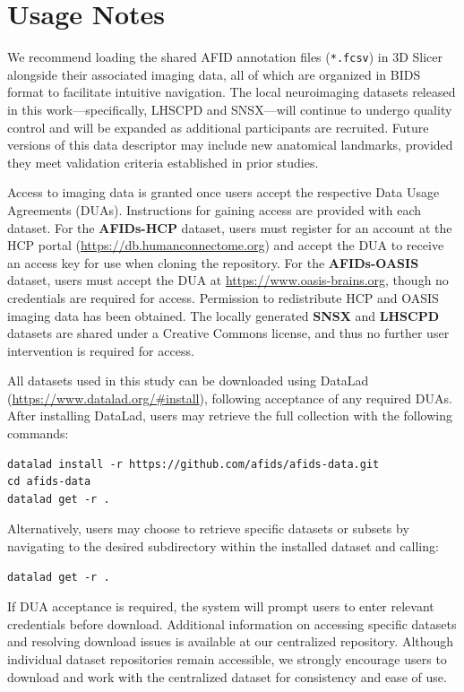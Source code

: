 \section{Usage Notes}
We recommend loading the shared AFID annotation files (\texttt{*.fcsv}) in 3D Slicer alongside their associated imaging data, all of which are organized in BIDS format to facilitate intuitive navigation. The local neuroimaging datasets released in this work—specifically, LHSCPD and SNSX—will continue to undergo quality control and will be expanded as additional participants are recruited. Future versions of this data descriptor may include new anatomical landmarks, provided they meet validation criteria established in prior studies\cite{afidvalidation1,afidvalidation2}.

Access to imaging data is granted once users accept the respective Data Usage Agreements (DUAs). Instructions for gaining access are provided with each dataset\cite{zenodo,openneuro1,openneuro2,openneuro3}. For the \textbf{AFIDs-HCP} dataset, users must register for an account at the HCP portal (\url{https://db.humanconnectome.org}) and accept the DUA to receive an access key for use when cloning the repository. For the \textbf{AFIDs-OASIS} dataset, users must accept the DUA at \url{https://www.oasis-brains.org}, though no credentials are required for access. Permission to redistribute HCP and OASIS imaging data has been obtained. The locally generated \textbf{SNSX}\cite{snsx} and \textbf{LHSCPD}\cite{lhscpd} datasets are shared under a Creative Commons license, and thus no further user intervention is required for access.

All datasets used in this study can be downloaded using DataLad (\url{https://www.datalad.org/#install})\cite{datalad}, following acceptance of any required DUAs. After installing DataLad, users may retrieve the full collection with the following commands:
\begin{verbatim}
datalad install -r https://github.com/afids/afids-data.git
cd afids-data
datalad get -r .
\end{verbatim}

Alternatively, users may choose to retrieve specific datasets or subsets by navigating to the desired subdirectory within the installed dataset and calling:
\begin{verbatim}
datalad get -r .
\end{verbatim}

If DUA acceptance is required, the system will prompt users to enter relevant credentials before download. Additional information on accessing specific datasets and resolving download issues is available at our centralized repository\cite{afidsdata}. Although individual dataset repositories remain accessible, we strongly encourage users to download and work with the centralized dataset for consistency and ease of use.



